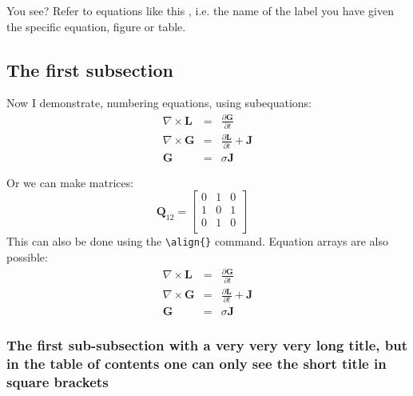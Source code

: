         You see? Refer to equations like this , i.e. the name of the label you have given the specific equation, figure or table.
        
        \subsection{The first subsection}
  
        Now I demonstrate, numbering equations, using subequations:
	  \begin{subequations}
		\begin{eqnarray}
    \label{2eq1d1}
	  \nabla\times\mathbf{L}  &=& \frac{\partial\mathbf{G}}{\partial t} \\
    \label{2eq1d2}
  	\nabla\times\mathbf{G}  &=& \frac{\partial\mathbf{L}}{\partial t} + \mathbf{J} \\
    \label{2eq1d3}
    \mathbf{G}              &=& \sigma\mathbf{J}
		\end{eqnarray}
			  \end{subequations}
	
				Or we can make matrices:
				\begin{equation}
				\mathbf{Q}_{12}=\left[\begin{array}{ccc}
		          0  &     1          &  0 \\
	            1  &     0          &  1 \\
	            0  &     1          &  0 \\
       	\end{array}\right]\quad
        \nonumber
		    \label{2eq1cf}
		    \end{equation}
		    This can also be done using the \verb"\align{}" command. Equation arrays are also possible:
     		\begin{eqnarray}
    		\label{2eq1e1}
	  \nabla\times\mathbf{L}  &=& \frac{\partial\mathbf{G}}{\partial t} \\
	    	\label{2eq1e2}
  	\nabla\times\mathbf{G}  &=& \frac{\partial\mathbf{L}}{\partial t} + \mathbf{J} \\
		    \label{2eq1e3}
    \mathbf{G}              &=& \sigma\mathbf{J}
		  \end{eqnarray}

       
        \subsubsection[Subsection Short Title]{The first sub-subsection with a very very very long title, but in the table of contents one can only see the short title in square brackets}

